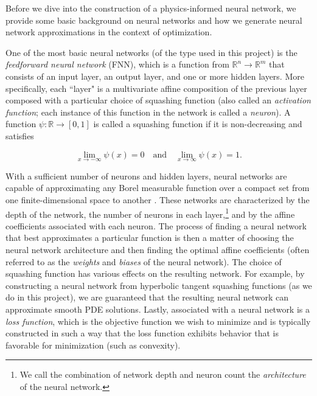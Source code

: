 Before we dive into the construction of a physics-informed neural network, we provide some basic background on neural 
networks and how we generate neural network approximations in the context of optimization.

One of the most basic neural networks (of the type used in this project) is the \textit{feedforward neural network} 
(FNN), which is a function from $\mathbb{R}^n \to \mathbb{R}^m$ that consists of an input layer, an output layer, and 
one or more hidden layers. More specifically, each ``layer" is a multivariate affine composition of the previous layer 
composed with a particular choice of squashing function (also called an \textit{activation function}; each instance of 
this function in the network is called a \textit{neuron}). A function $\psi: \mathbb{R} \to [0, 1]$ is called a 
squashing function if it is non-decreasing and satisfies

$$
\lim\limits_{x \to -\infty} \psi(x) = 0 \quad \text{and} \quad \lim\limits_{x \to \infty} \psi(x) = 1.
$$

With a sufficient number of neurons and hidden layers, neural networks are capable of approximating any Borel measurable
function over a compact set from one finite-dimensional space to another \cite{hornik_multilayer_1989}. These networks 
are characterized by the depth of the network, the number of neurons in each layer,\footnote{
    We call the combination of network depth and neuron count the \textit{architecture} of the neural network.
} and by the affine coefficients associated with each neuron. The process of finding a neural network that best 
approximates a particular function is then a matter of choosing the neural network architecture and then finding the optimal
affine coefficients (often referred to as the \textit{weights} and \textit{biases} of the neural network). The choice of 
squashing function has various effects on the resulting network. For example, by constructing a neural network from 
hyperbolic tangent squashing functions (as we do in this project), we are guaranteed that the resulting neural network can 
approximate smooth PDE solutions. Lastly, associated with a neural network is a \textit{loss function}, which is the 
objective function we wish to minimize and is typically constructed in such a way that the loss function exhibits behavior 
that is favorable for minimization (such as convexity).